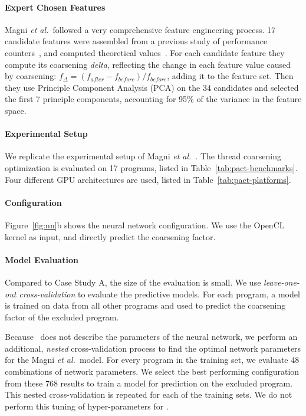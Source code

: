 

\paragraph{Expert Chosen Features} Magni \emph{et al.\ }followed a very comprehensive feature engineering process. 17 candidate features were assembled from a previous study of performance counters~\cite{Magni2}, and computed theoretical values~\cite{Sim2012}. For each candidate feature they compute its coarsening \emph{delta}, reflecting the change in each feature value caused by coarsening: $f_{\Delta} = (f_{after} - f_{before}) / f_{before}$, adding it to the feature set. Then they use Principle Component Analysis (PCA) on the 34 candidates and selected the first 7 principle components, accounting for 95\% of the variance in the feature space.

\paragraph{Experimental Setup} We replicate the experimental setup of Magni \emph{et al.}~\cite{Magni2014}. The thread coarsening optimization is evaluated on 17 programs, listed in Table~\ref{tab:pact-benchmarks}. Four different GPU architectures are used, listed in Table~\ref{tab:pact-platforms}.

\paragraph{\DeepTune Configuration} Figure~\ref{fig:nn}b shows the neural network configuration. We use the OpenCL kernel as input, and directly predict the coarsening factor. %

\paragraph{Model Evaluation} Compared to Case Study A, the size of the evaluation is small. We use \emph{leave-one-out cross-validation} to evaluate the predictive models. For each program, a model is trained on data from all other programs and used to predict the coarsening factor of the excluded program.

Because~\cite{Magni2014} does not describe the parameters of the neural network, we perform an additional, \emph{nested} cross-validation process to find the optimal network parameters for the Magni \emph{et al.\ }model. For every program in the training set, we evaluate 48 combinations of network parameters. We select the best performing configuration from these 768 results to train a model for prediction on the excluded program. This nested cross-validation is repeated for each of the training sets. We do not perform this tuning of hyper-parameters for \DeepTune.

